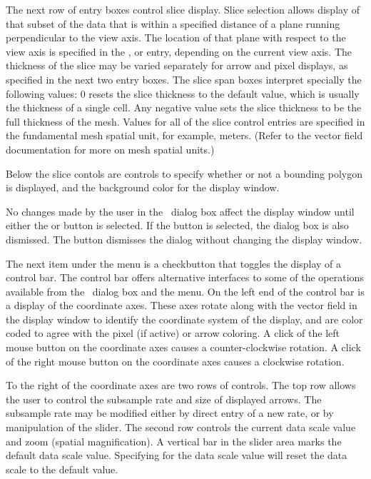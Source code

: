 The next row of entry boxes control slice
display.  Slice selection allows display of that subset of the data
that is within a specified distance of a plane running perpendicular
to the view axis.  The location of that plane with respect to the view
axis is specified in the ,  or
 entry, depending on the current view axis.
The thickness of the slice may be varied separately for arrow and
pixel displays, as specified in the next two entry boxes.  The slice
span boxes interpret specially the following values: 0 resets the
slice thickness to the default value, which is usually the thickness
of a single cell.  Any negative value sets the slice thickness to be
the full thickness of the mesh.  Values for all of the slice control
entries are specified in the fundamental mesh spatial unit, for
example, meters.  (Refer to the vector field
documentation for more on mesh spatial units.)

Below the slice contols are controls to specify whether or not a
bounding polygon is displayed, and the background
color for the display window.

No changes made by the user in the {}\
dialog box affect the display window until either the
 or  button is selected.  If the  button is
selected, the dialog box is also dismissed.  The {\btn{Close}}
button dismisses the dialog without changing the display window.

The next item under the  menu is a checkbutton that
toggles the display of a control bar.  The control bar offers
alternative interfaces to some of the operations available from the
\btn{Options\pipe Configure\ldots}\ dialog box and the \btn{View} menu.
On the left end of the control bar is a display of the coordinate axes.
These axes rotate along with the vector field in the display window to
identify the coordinate system of the display, and are color coded to
agree with the pixel (if active) or arrow coloring.  A click of the left
mouse button on the coordinate axes causes a counter-clockwise rotation.
A click of the right mouse button on the coordinate axes causes a
clockwise rotation.

To the right of the coordinate axes are two rows of controls.  The top
row allows the user to control the subsample rate and size of displayed
arrows.  The subsample rate may be modified either by direct entry of a
new rate, or by manipulation of the slider.  The second row controls the
current data scale value and zoom (spatial magnification).  A vertical
bar in the slider area marks the default data scale value.  Specifying
\key{0} for the data scale value will reset the data scale to the
default value.

